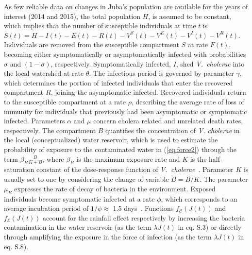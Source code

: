 As few reliable data on changes in Juba's population are available for the years of interest (2014 and 2015), the total population $H$, is assumed to be constant, which implies that the number of susceptible individuals at time $t$ is $S(t) = H - I(t) - E(t) - R(t) - V^S(t) - V^E(t) - V^I(t) - V^R(t)$. Individuals are removed from the susceptible compartment $S$ at rate $F(t)$, becoming either symptomatically or asymptomatically infected with probabilities $\sigma$ and $(1-\sigma)$, respectively. Symptomatically infected, $I$, shed \textit{V.~cholerae} into the local watershed at rate $\theta$. 
The infectious period is governed by parameter $\gamma$, which determines the portion of infected individuals that enter the recovered compartment $R$, joining the asymptomatic infected. Recovered individuals return to the susceptible compartment at a rate $\rho$, describing the average rate of loss of immunity for individuals that previously had been asymptomatic or symptomatic infected. Parameters $\alpha$ and $\mu$ concern cholera related and unrelated death rates, respectively. The compartment $B$ quantifies the concentration of \textit{V. cholerae} in the local (conceptualized) water reservoir, which is used to estimate the probability of exposure to the contaminated water in (\ref{eq:force2}) through the term $\beta_B  \frac{B}{K+B}$, where  $\beta_B$ is the maximum exposure rate and $K$ is the half-saturation constant of the dose-response function of \textit{V.~cholerae}~\cite{codeco01}. Parameter $K$ is usually set to one by considering the change of variable $\tilde{B}=B/K$. The parameter $\mu_B$ expresses the rate of decay of bacteria in the environment. 
Exposed individuals become symptomatic infected at a rate $\phi$, which corresponds to an average incubation period of $1/\phi\approx$ 1.5 days~\cite{azman13}.
Functions $f_{\mathcal{C}}\left(J(t)\right)$ and $f_{\mathcal{E}}\left(J(t)\right)$ account for the rainfall effect respectively by increasing the bacteria contamination in the water reservoir (as the term $\lambda J(t)$ in eq. S.3) or directly through amplifying the exposure in the force of infection (as the term  $\lambda J(t)$ in eq. S.8).

